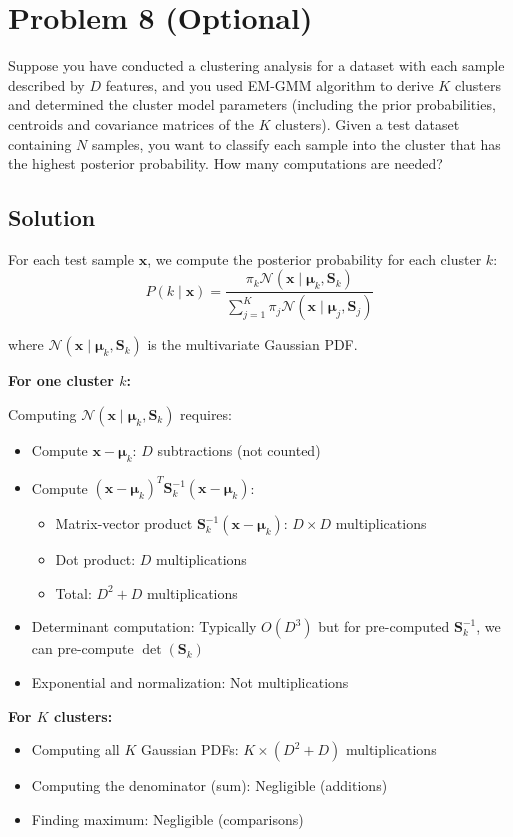 \documentclass[11pt]{article}
\newcommand{\xbf}{\mathbf{x}}
\newcommand{\Sbf}{\mathbf{S}}
\def\mubf{{\boldsymbol \mu}}
\begin{document}
\newpage

\section*{Problem 8 (Optional)}

Suppose you have conducted a clustering analysis for a dataset with each sample described by $D$ features, and you used EM-GMM algorithm to derive $K$ clusters and determined the cluster model parameters (including the prior probabilities, centroids and covariance matrices of the $K$ clusters). Given a test dataset containing $N$ samples, you want to classify each sample into the cluster that has the highest posterior probability. How many computations are needed?

\subsection*{Solution}

For each test sample $\xbf$, we compute the posterior probability for each cluster $k$:
\[
P(k \mid \xbf) = \frac{\pi_k \mathcal{N}(\xbf \mid \mubf_k, \Sbf_k)}{\sum_{j=1}^K \pi_j \mathcal{N}(\xbf \mid \mubf_j, \Sbf_j)}
\]

where $\mathcal{N}(\xbf \mid \mubf_k, \Sbf_k)$ is the multivariate Gaussian PDF.

\textbf{For one cluster $k$:}

Computing $\mathcal{N}(\xbf \mid \mubf_k, \Sbf_k)$ requires:
\begin{itemize}
\item Compute $\xbf - \mubf_k$: $D$ subtractions (not counted)
\item Compute $(\xbf - \mubf_k)^T \Sbf_k^{-1} (\xbf - \mubf_k)$:
  \begin{itemize}
  \item Matrix-vector product $\Sbf_k^{-1} (\xbf - \mubf_k)$: $D \times D$ multiplications
  \item Dot product: $D$ multiplications
  \item Total: $D^2 + D$ multiplications
  \end{itemize}
\item Determinant computation: Typically $O(D^3)$ but for pre-computed $\Sbf_k^{-1}$, we can pre-compute $\det(\Sbf_k)$
\item Exponential and normalization: Not multiplications
\end{itemize}

\textbf{For $K$ clusters:}
\begin{itemize}
\item Computing all $K$ Gaussian PDFs: $K \times (D^2 + D)$ multiplications
\item Computing the denominator (sum): Negligible (additions)
\item Finding maximum: Negligible (comparisons)
\end{itemize}
\end{document}
